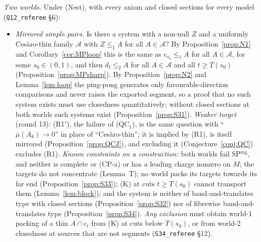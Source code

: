 \documentclass[11pt]{article}
\theoremstyle{definition}
\theoremstyle{remark}
\newcommand{\src}[1]{\texttt{#1}}
\begin{document}
\emph{Two worlds.} Under (Nest), with every axiom and closed sections for every model (\src{Q12\_referee} \S6):
\begin{itemize}[leftmargin=*]
\item[\textbf{(R1)}] \emph{Mirrored simple pairs.} Is there a system with a non-null $Z$ and a uniformly Ces\`aro-thin family $\mathcal A$ with $Z\le_1A$ for all $A\in\mathcal A$? By Proposition~\ref{prop:N1} and Corollary~\ref{cor:MPloop} this is the same as $c_{s_0}\le_1A$ for all $A\in\mathcal A$, for some $s_0\in(0,1)$, and then $d_t\le_2A$ for all $A\in\mathcal A$ and all $t\ge T(s_0)$ (Proposition~\ref{prop:MPsharp}). By Proposition~\ref{prop:N2} and Lemma~\ref{lem:loop} the ping-pong generates only favourable-direction comparisons and never raises the exported segment, so a proof that no such system exists must use closedness quantitatively; without closed sections at both worlds such systems exist (Proposition~\ref{prop:S31}). \emph{Weaker target} (round 13): (R1$'$), the failure of (QC$_1$), is the same question with ``$\bar\mu(A_k)\to0$'' in place of ``Ces\`aro-thin''; it is implied by (R1), is itself mirrored (Proposition~\ref{prop:QCJ}), and excluding it (Conjecture~\ref{conj:QC}) excludes (R1). \emph{Known constraints on a construction:} both worlds fail SP$^{\mathrm{reg}}$, and neither is complete or (CP-a) or has a leading charge nonzero on $M$; the targets do not concentrate (Lemma~T); no world packs its targets towards its far end (Proposition~\ref{prop:S33}); (K) at cuts $t\ge T(s_0)$ cannot transport them (Lemma~\ref{lem:block}); and the system is neither of band-and-translates type with closed sections (Proposition~\ref{prop:S32}) nor of fibrewise band-and-translates type (Proposition~\ref{prop:S34}). \emph{Any exclusion} must obtain world-1 packing of a thin $A\cap c_t$ from (K) at cuts below $T(s_0)$, or from world-2 closedness at sources that are not segments (\src{S34\_referee} \S12).

\end{itemize}
\end{document}

